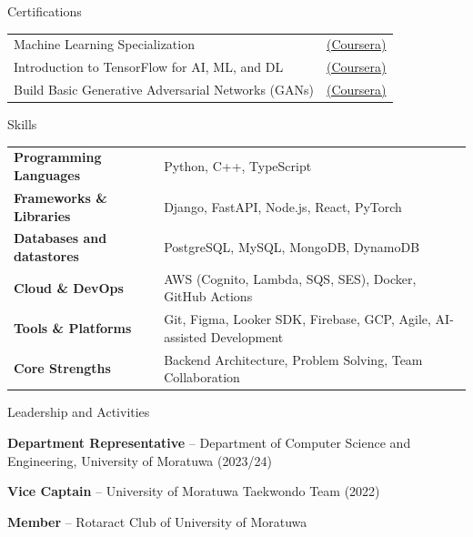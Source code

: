 \documentclass[11pt]{resume}
\begin{document}

\begin{rSection}{Certifications}
\begin{tabular}{@{} l l}
Machine Learning Specialization & \href{https://coursera.org/share/ef8d6d135141afe80d34fe5a8c1c5c41}{(Coursera)} \\
Introduction to TensorFlow for AI, ML, and DL & \href{https://coursera.org/share/d764e1a751d90f2a7be652fc879fdda3}{(Coursera)} \\
Build Basic Generative Adversarial Networks (GANs) & \href{https://coursera.org/share/617b8284cec684599b82d9f5922cb778}{(Coursera)} \\
\end{tabular}
\end{rSection}



\begin{rSection}{Skills}
\begin{tabular}{@{} >{\bfseries}l @{\hspace{6ex}} l @{}}
Programming Languages & Python, C++, TypeScript \\[4pt]
Frameworks \& Libraries & Django, FastAPI, Node.js, React, PyTorch \\[4pt]
Databases and datastores & PostgreSQL, MySQL, MongoDB, DynamoDB \\[4pt]
Cloud \& DevOps & AWS (Cognito, Lambda, SQS, SES), Docker, GitHub Actions \\[4pt]
Tools \& Platforms & Git, Figma, Looker SDK, Firebase, GCP, Agile, AI-assisted Development \\[4pt]
Core Strengths & Backend Architecture, Problem Solving, Team Collaboration
\end{tabular}
\end{rSection}


\begin{rSection}{Leadership and Activities}
\item \textbf{Department Representative} – Department of Computer Science and Engineering, University of Moratuwa (2023/24)
\item \textbf{Vice Captain} – University of Moratuwa Taekwondo Team (2022)
\item \textbf{Member} – Rotaract Club of University of Moratuwa
\end{rSection}
\end{document}
